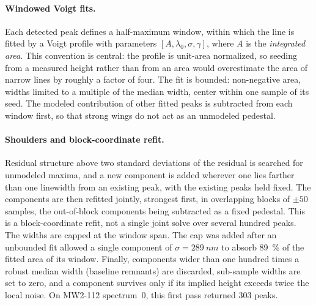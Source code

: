 \paragraph{Windowed Voigt fits.}
Each detected peak defines a half-maximum window, within which the line is fitted by a
Voigt profile \citep{olivero1977voigt,thompson1987voigt} with parameters
$[A,\lambda_0,\sigma,\gamma]$, where $A$ is the \emph{integrated area}.
This convention is central: the profile is unit-area normalized, so seeding from a
measured height rather than from an area would overestimate the area of narrow lines by
roughly a factor of four.
The fit is bounded: non-negative area, widths limited to a multiple of the median width, center within one sample of its seed.
The modeled contribution of other fitted peaks is subtracted from each window first, so that strong wings do not act as an unmodeled pedestal.

\paragraph{Shoulders and block-coordinate refit.}
Residual structure above two standard deviations of the residual is searched for
unmodeled maxima, and a new component is added wherever one lies farther than one
linewidth from an existing peak, with the existing peaks held fixed.
The components are then refitted jointly, strongest first, in overlapping blocks of
$\pm 50$ samples, the out-of-block components being subtracted as a fixed pedestal.
This is a block-coordinate refit, not a single joint solve over several hundred peaks.
The widths are capped at the window span.
The cap was added after an unbounded fit allowed a single component of
$\sigma = \SI{289}{nm}$ to absorb \SI{89}{\percent} of the fitted area of its window.
Finally, components wider than one hundred times a robust median width
(baseline remnants) are discarded, sub-sample widths are set to zero, and a component
survives only if its implied height exceeds twice the local noise.
On MW2-112 spectrum~0, this first pass returned 303 peaks.

